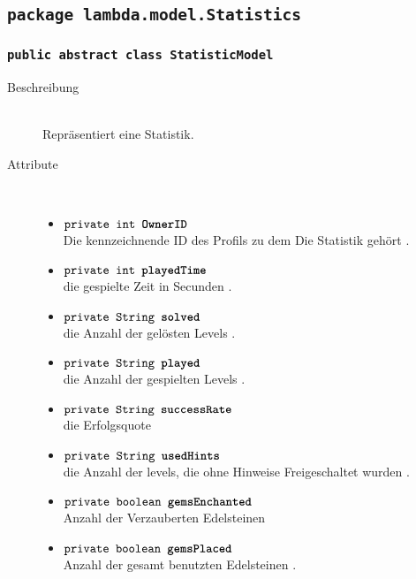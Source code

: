\subsection{\texttt{package lambda.model.Statistics}}
		\subsubsection{\normalfont \texttt{public abstract class \textbf{StatisticModel}}} 
		
		\begin{description}
		
		\item[Beschreibung] \hfill \\ Repräsentiert eine Statistik.
		\item[Attribute] \hfill \\
			\vspace{-.8cm}
			\begin{itemize}
				\item $\texttt{private int \textbf{OwnerID}}$ \\ Die kennzeichnende ID des Profils zu dem Die Statistik gehört .
				\item $\texttt{private int \textbf{playedTime}}$ \\ die gespielte Zeit in Secunden .
				\item $\texttt{private String \textbf{solved}}$ \\ die Anzahl der gelösten Levels .
				\item $\texttt{private String \textbf{played}}$ \\ die Anzahl der gespielten Levels .
				\item $\texttt{private String \textbf{successRate}}$ \\die Erfolgsquote
				\item $\texttt{private String \textbf{usedHints}}$ \\  die Anzahl der levels, die ohne Hinweise Freigeschaltet wurden .
				\item $\texttt{private boolean \textbf{gemsEnchanted}}$ \\ Anzahl der Verzauberten Edelsteinen 
				\item $\texttt{private boolean \textbf{gemsPlaced}}$ \\ Anzahl der gesamt benutzten Edelsteinen .
			\end{itemize}
			
		
			

\end{description}

